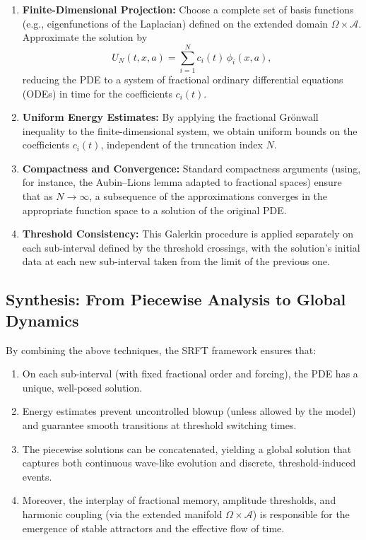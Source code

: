 \documentclass[12pt]{article}
\begin{document}
\begin{enumerate}
    \item \textbf{Finite-Dimensional Projection:}  
          Choose a complete set of basis functions (e.g., eigenfunctions of the Laplacian) defined on the extended domain $\Omega \times \mathcal{A}$. Approximate the solution by
          \[
             U_N(t,x,a) = \sum_{i=1}^{N} c_i(t) \, \phi_i(x,a),
          \]
          reducing the PDE to a system of fractional ordinary differential equations (ODEs) in time for the coefficients $c_i(t)$.
          
    \item \textbf{Uniform Energy Estimates:}  
          By applying the fractional Grönwall inequality to the finite-dimensional system, we obtain uniform bounds on the coefficients $c_i(t)$, independent of the truncation index $N$.
          
    \item \textbf{Compactness and Convergence:}  
          Standard compactness arguments (using, for instance, the Aubin–Lions lemma adapted to fractional spaces) ensure that as $N \to \infty$, a subsequence of the approximations converges in the appropriate function space to a solution of the original PDE.
          
    \item \textbf{Threshold Consistency:}  
          This Galerkin procedure is applied separately on each sub-interval defined by the threshold crossings, with the solution’s initial data at each new sub-interval taken from the limit of the previous one.
\end{enumerate}

\medskip

\subsection{Synthesis: From Piecewise Analysis to Global Dynamics}
By combining the above techniques, the SRFT framework ensures that:
\begin{enumerate}
    \item On each sub-interval (with fixed fractional order and forcing), the PDE has a unique, well-posed solution.
    \item Energy estimates prevent uncontrolled blowup (unless allowed by the model) and guarantee smooth transitions at threshold switching times.
    \item The piecewise solutions can be concatenated, yielding a global solution that captures both continuous wave-like evolution and discrete, threshold-induced events.
    \item Moreover, the interplay of fractional memory, amplitude thresholds, and harmonic coupling (via the extended manifold $\Omega \times \mathcal{A}$) is responsible for the emergence of stable attractors and the effective flow of time.
\end{enumerate}
\end{document}
